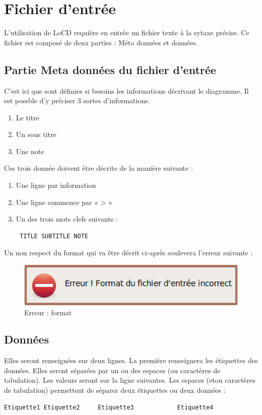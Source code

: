 \chapter{Fichier d'entrée}
\label{chap:fichDonnees}
L'utilisation de LoCD requière en entrée un fichier texte à la sytaxe précise. Ce fichier est composé de deux parties : Méta données et données.%
\section{Partie Meta données du fichier d'entrée}
C'est ici que sont définies si besoins les informations décrivant le diagramme. Il est possble d'y préciser 3 sortes d'informations. 
\begin{enumerate}
\item
Le titre 
\item
Un sous titre
\item
Une note
\end{enumerate}
Ces trois donnée doivent être décrite de la manière suivante : 
\begin{enumerate}
\item
Une ligne par information 
\item
Une ligne commence par  « > »
\item
Un des trois mots clefs suivants : \begin{verbatim} TITLE SUBTITLE NOTE \end{verbatim}
\end{enumerate}
Un non respect du format qui va être décrit ci-après soulevera l'erreur suivante : 
\begin{figure}[htbp]
\centering
  \includegraphics[scale=0.40]{img/eformatfichier}
  \caption{Erreur : format}
  \label{fig:enbdonees}
\end{figure}


\section{Données}
Elles seront renseignées sur deux lignes. La première renseignera les étiquettes des données. Elles seront séparées par un ou des espaces (ou caractères de tabulation). Les valeurs seront sur la ligne suivantes. Les espaces (et\/ou caractères de tabulation) permettent de séparer deux étiquettes ou deux données :
\begin{verbatim}
Etiquette1 Etiquette2     Etiquette3 			Etiquette4
 \end{verbatim} 
 
